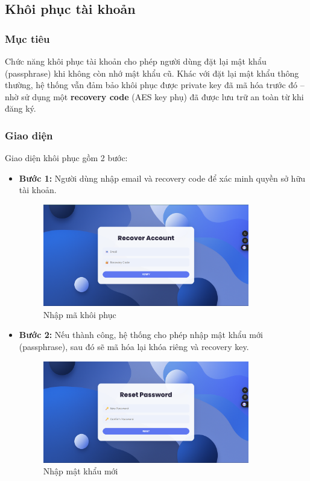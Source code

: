\newpage
\subsection{Khôi phục tài khoản}

\subsubsection*{Mục tiêu}
Chức năng khôi phục tài khoản cho phép người dùng đặt lại mật khẩu (passphrase) khi không còn nhớ mật khẩu cũ. Khác với đặt lại mật khẩu thông thường, hệ thống vẫn đảm bảo khôi phục được private key đã mã hóa trước đó – nhờ sử dụng một \textbf{recovery code} (AES key phụ) đã được lưu trữ an toàn từ khi đăng ký.

\subsubsection*{Giao diện}
Giao diện khôi phục gồm 2 bước:
\begin{itemize}
    \item \textbf{Bước 1:} Người dùng nhập email và recovery code để xác minh quyền sở hữu tài khoản.
    \begin{figure}[H]
        \centering
        \includegraphics[width=0.85\textwidth]{img/17_recover/17_recover_recovery_code.png}
        \caption{Nhập mã khôi phục}
    \end{figure}

    \item \textbf{Bước 2:} Nếu thành công, hệ thống cho phép nhập mật khẩu mới (passphrase), sau đó sẽ mã hóa lại khóa riêng và recovery key.
    \begin{figure}[H]
        \centering
        \includegraphics[width=0.85\textwidth]{img/17_recover/17_recovery_pw.png}
        \caption{Nhập mật khẩu mới}
    \end{figure}
\end{itemize}

